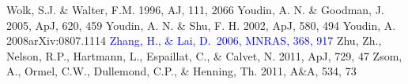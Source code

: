 \documentclass[apj]{emulateapj}
\def\blue#1{\textcolor{blue}{#1}}
\begin{document}
\begin{thebibliography}{}
 Wolk, S.J. \& Walter, F.M. 1996, AJ, 111, 2066
 Youdin, A. N. \& Goodman, J. 2005, ApJ, 620, 459
 Youdin, A. N. \& Shu, F. H. 2002, ApJ, 580, 494
 Youdin, A. 2008arXiv:0807.1114
\blue{ Zhang, H., \& Lai, D.\ 2006, MNRAS, 368, 917}
 Zhu, Zh., Nelson, R.P., Hartmann, L.,  Espaillat, C., \& Calvet, N. 2011, ApJ, 729, 47
 Zsom, A., Ormel, C.W., Dullemond, C.P., \& Henning, Th. 2011, A\&A, 534, 73
\end{thebibliography}
\end{document}
